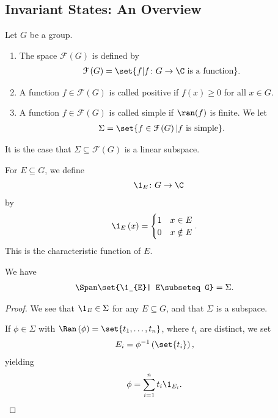 \documentclass[10pt]{mypackage2}
\begin{document}
\subsection{Invariant States: An Overview}%
\begin{definition}
  Let $G$ be a group.
  \begin{enumerate}[(1)]
    \item The space $\mathcal{F}\left(G\right)$ is defined by
      \begin{align*}
        \mathcal{F}\left(G\right) &= \set{f | f\colon G\rightarrow \C\text{ is a function}}.
      \end{align*}
    \item A function $f\in \mathcal{F}\left(G\right)$ is called positive if $f(x) \geq 0$ for all $x\in G$.
    \item A function $f\in \mathcal{F}\left(G\right)$ is called simple if $\ran(f)$ is finite. We let
      \begin{align*}
        \Sigma &= \set{f\in \mathcal{F}\left(G\right) | f\text{ is simple}}.
      \end{align*}
  \end{enumerate}
\end{definition}
\begin{fact}
  It is the case that $\Sigma \subseteq \mathcal{F}\left(G\right)$ is a linear subspace.
\end{fact}
\begin{definition}
  For $E\subseteq G$, we define
  \begin{align*}
    \1_{E}\colon G\rightarrow \C
  \end{align*}
  by
  \begin{align*}
    \1_{E}\left(x\right) &= \begin{cases}
      1 & x\in E\\
      0 & x\notin E
    \end{cases}.
  \end{align*}
  This is the characteristic function of $E$.
\end{definition}
\begin{fact}
  We have
  \begin{align*}
    \Span\set{\1_{E}| E\subseteq G} &= \Sigma.
  \end{align*}
\end{fact}
\begin{proof}
  We see that $\1_{E}\in \Sigma$ for any $E\subseteq G$, and that $\Sigma$ is a subspace.\newline

  If $\phi\in \Sigma$ with $\Ran\left(\phi\right) = \set{t_1,\dots,t_n}$, where $t_i$ are distinct, we set
  \begin{align*}
    E_i &= \phi^{-1}\left(\set{t_i}\right),
  \end{align*}
  yielding
  \begin{align*}
    \phi &= \sum_{i=1}^{n}t_i\1_{E_i}.
  \end{align*}
\end{proof}
\end{document}
